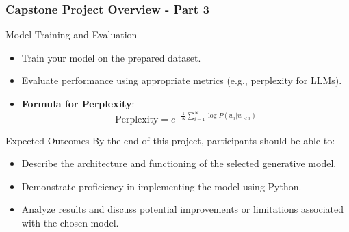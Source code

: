\documentclass[aspectratio=169]{beamer}
\begin{document}
\begin{frame}[fragile]
    \frametitle{Capstone Project Overview - Part 3}
    \begin{block}{Model Training and Evaluation}
        \begin{itemize}
            \item Train your model on the prepared dataset.
            \item Evaluate performance using appropriate metrics (e.g., perplexity for LLMs).
            \item \textbf{Formula for Perplexity}:
            \begin{equation}
            \text{Perplexity} = e^{-\frac{1}{N} \sum_{i=1}^{N} \log P(w_i | w_{<i})}
            \end{equation}
        \end{itemize}
    \end{block}
    \begin{block}{Expected Outcomes}
        By the end of this project, participants should be able to:
        \begin{itemize}
            \item Describe the architecture and functioning of the selected generative model.
            \item Demonstrate proficiency in implementing the model using Python.
            \item Analyze results and discuss potential improvements or limitations associated with the chosen model.
        \end{itemize}
    \end{block}
\end{frame}
\end{document}
